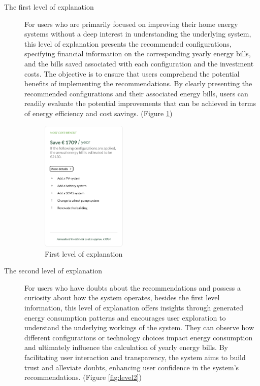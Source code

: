 \begin{description}
  \item[The first level of explanation] For users who are primarily focused on improving their home energy systems without a deep interest in understanding the underlying system, 
    this level of explanation presents the recommended configurations, specifying financial information on the corresponding yearly energy bills, and the bills saved associated with each configuration and the investment costs. 
    The objective is to ensure that users comprehend the potential benefits of implementing the recommendations. 
    By clearly presenting the recommended configurations and their associated energy bills, users can readily evaluate the potential improvements that can be achieved in terms of energy efficiency and cost savings. (Figure \ref{fig:level1})
    \begin{figure}[h]
      \centering
      \includegraphics[width=0.4\textwidth]{Images/level1.png}
      \caption{First level of explanation}
      \label{fig:level1}
    \end{figure}
  \item[The second level of explanation] For users who have doubts about the recommendations and possess a curiosity about how the system operates, 
    besides the first level information, this level of explanation offers insights through generated energy consumption patterns and encourages user exploration to understand the underlying workings of the system. 
    They can observe how different configurations or technology choices impact energy consumption and ultimately influence the calculation of yearly energy bills. 
    By facilitating user interaction and transparency, the system aims to build trust and alleviate doubts, enhancing user confidence in the system's recommendations. (Figure \ref{fig:level2})

\end{description}
